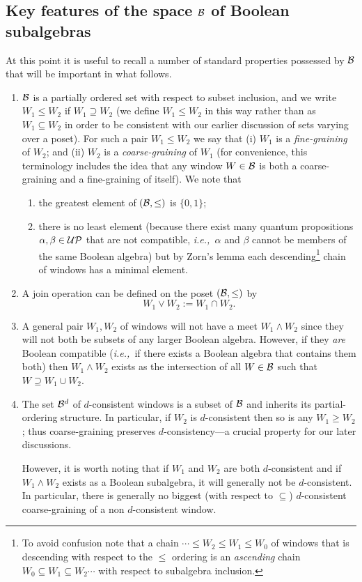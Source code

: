 \documentclass[12pt]{article}
\newcounter{def-number}[section]
\newcommand{\be}{\begin{enumerate}}
\newcommand{\ee}{\end{enumerate}}
\newcommand{\beq}{\begin{equation}}
\newcommand{\eeq}{\end{equation}}
\newcommand{\ie}{{\em i.e.,\ }}
\renewcommand{\a}{\alpha}                   %
\renewcommand{\b}{\beta}                    %
\newcommand{\B}{{\cal B}}
\newcommand{\Bd}{{\cal B}^d}
\newcommand{\UP}{{\cal UP}}
\begin{document}
\subsection{Key features of the space $\B$ of Boolean subalgebras}
At this point it is useful to recall a number of standard properties
possessed by $\B$ that will be important in what follows.
\be
\item {$\B$ is a partially ordered set with respect to subset
inclusion, and we write $W_1\leq W_2$ if $W_1\supseteq W_2$ (we
define $W_1\leq W_2$ in this way rather than as $W_1\subseteq W_2$
in order to be consistent with our earlier discussion of sets
varying over a poset). For such a pair $W_1\leq W_2$ we say that (i)
$W_1$ is a {\em fine-graining\/} of $W_2$; and (ii) $W_2$ is a {\em
coarse-graining\/} of $W_1$ (for convenience, this terminology
includes the idea that any window $W\in\B$ is both a coarse-graining
and a fine-graining of itself). We note that 
	\be 
	\item the greatest element of $(\B,\leq)$ is $\{0,1\}$; 
	\item there is no least element (because there exist many
 	quantum propositions $\a,\b\in\UP$ that are not compatible, 
	\ie $\a$ and $\b$ cannot be members of the same Boolean algebra) 
		but by Zorn's lemma each 
		descending\footnote{To avoid confusion note
		that a chain $\cdots\leq W_2\leq W_1\leq W_0$ of windows that 
		is descending
		with respect to the $\leq$ ordering is an {\em
		ascending\/} chain $W_0\subseteq W_1\subseteq W_2\cdots$ with 
		respect to subalgebra inclusion.} chain of windows has a minimal 
		element.  
	\ee
	}

\item A join operation can be defined on the poset $(\B,\leq)$ by
\beq
		W_1\lor W_2:=W_1\cap W_2.
\eeq

\item A general pair $W_1,W_2$ of windows will not
have a meet $W_1\land W_2$ since they will not both be subsets of
any larger Boolean algebra. However, if they {\em are\/} Boolean
compatible (\ie if there exists a Boolean algebra that contains them
both) then $W_1\land W_2$ exists as the intersection of all $W\in\B$
such that $W\supseteq W_1\cup W_2$.

\item {The set $\Bd$ of $d$-consistent windows is a 
subset of $\B$ and inherits its partial-ordering structure. In
particular, if $W_2$ is $d$-consistent then so is any $W_1\geq W_2$;
thus coarse-graining preserves $d$-consistency---a crucial property
for our later discussions.

	However, it is worth noting that if $W_1$ and $W_2$ are both
$d$-consistent and if $W_1\land W_2$ exists as a Boolean subalgebra,
it will generally not be $d$-consistent. In particular, there is
generally no biggest (with respect to $\subseteq$) $d$-consistent
coarse-graining of a non $d$-consistent window.  
	}
\ee
\end{document}
